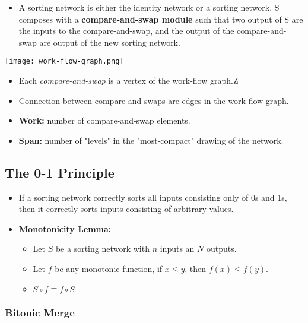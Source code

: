 \documentclass[../main.tex]{subfiles}
\begin{document}
\begin{itemize}
	\item A sorting network is either the identity network or a sorting network, S composes with a \textbf{compare-and-swap module} such that two output of S are the inputs to the compare-and-swap, and the output of the compare-and-swap are output of the new sorting network.
\end{itemize}

\begin{center}
	\texttt{[image: work-flow-graph.png]}
\end{center}

\begin{itemize}
	\item Each \textit{compare-and-swap} is a vertex of the work-flow graph.Z
	\item Connection between compare-and-swaps are edges in the work-flow graph.
	\item \textbf{Work:} number of compare-and-swap elements.
	\item \textbf{Span:} number of "levels" in the "most-compact" drawing of the network.
\end{itemize}

\subsection{The 0-1 Principle}

\begin{itemize}
	\item If a sorting network correctly sorts all inputs consisting only of 0s and 1s, then it correctly sorts inputs consisting of arbitrary values.
	\item \textbf{Monotonicity Lemma:}
	      \begin{itemize}
		      \item Let \(S\) be a sorting network with \(n\) inputs an \(N\) outputs.
		      \item Let \(f\) be any monotonic function, if \(x \leq y\), then \(f(x) \leq f(y)\).
		      \item \(S \circ f \equiv f \circ S\)
	      \end{itemize}
\end{itemize}

\subsubsection{Bitonic Merge}
\end{document}
